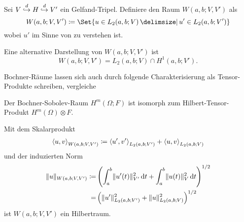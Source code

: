 \begin{Definition}
\label{definition:gl:bochner_raum_W}
    Sei $V \stackrel{d}{\hookrightarrow} H \stackrel{d}{\hookrightarrow} V'$ ein Gelfand-Tripel.
    Definiere den Raum $W(a, b; V, V')$ als
    \begin{equation}
        W(a, b; V, V') \deq \Set{u \in L_{2}(a, b; V) \given u' \in L_{2}(a, b; V')}
    \end{equation}
    wobei $u'$ im Sinne von  zu verstehen ist.
\end{Definition}

\begin{Bemerkung}
\label{bemerkung:gl:alternative_darstellung_bochner}
    Eine alternative Darstellung von $W(a, b; V, V')$ ist
    \begin{equation}
        W(a, b; V, V') = L_{2}(a, b; V) \cap H^{1}(a, b; V').
    \end{equation}
\end{Bemerkung}

Bochner-Räume lassen sich auch durch folgende Charakterisierung als Tensor-Produkte schreiben, vergleiche \cite[Theorem 12.7.1]{Aubin:2000un}
\begin{Satz}
    Der Bochner-Sobolev-Raum $H^{m}(\Omega; F)$ ist isomorph zum Hilbert-Tensor-Produkt $H^{m}(\Omega) \otimes F$.
\end{Satz}

\begin{Lemma}
\label{lemma:gl:w_a_v_v_ist_hilbertraum}
    Mit dem Skalarprodukt
    \begin{equation}
        \left\langle u,v\right\rangle_{W(a, b; V, V')} \coloneqq \left\langle u',v'\right\rangle_{L_{2}(a, b; V')} +  \left\langle u,v\right\rangle_{L_{2}(a, b; V)}
    \end{equation}
    und der induzierten Norm
    \begin{equation}
        \begin{aligned}
            \lVert u\rVert_{W(a, b; V, V')}
            \coloneqq& \left( \int_{a}^{b} \lVert u'(t)\rVert_{V'}^{2} \mathop{}\!\mathrm{d} t + \int_{a}^{b} \lVert u(t)\rVert_{V}^{2} \mathop{}\!\mathrm{d} t \right)^{1/2}
            \\=& \left( \lVert u'\rVert_{L_{2}(a, b; V')}^{2} + \lVert u\rVert_{L_{2}(a, b; V)}^{2} \right)^{1/2}
        \end{aligned}
    \end{equation}
    ist $W(a, b; V, V')$ ein Hilbertraum.
\end{Lemma}

